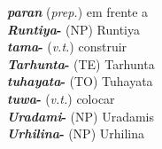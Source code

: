 \begin{multicols}{2}
\begin{hangparas}{1em}{1}
		\textbf{\emph{paran}} (\emph{prep.}) \tabto{1em} em frente a\\
		\textbf{\emph{Runtiya}-} (NP) \tabto{1em} Runtiya\\
		\textbf{\emph{tama}-} (\emph{v.t.}) \tabto{1em} construir\\
		\textbf{\emph{Tarhunta}-} (TE) \tabto{1em} Tarhunta\\
		\textbf{\emph{tuhayata}-} (TO) \tabto{1em} Tuhayata\\
		\textbf{\emph{tuwa}-} (\emph{v.t.}) \tabto{1em} colocar\\
		\textbf{\emph{Uradami}-} (NP) \tabto{1em} Uradamis\\
		\textbf{\emph{Urhilina}-} (NP) \tabto{1em} Urhilina\\
	\end{hangparas}
\end{multicols}
